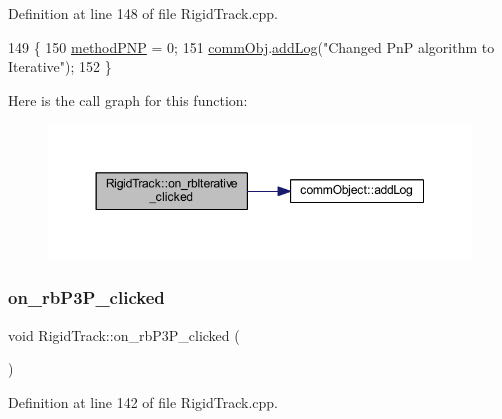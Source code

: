 Definition at line 148 of file Rigid\+Track.\+cpp.


\begin{DoxyCode}
149 \{
150     \hyperlink{main_8cpp_ab5e634b66221f494504aea1557af5df9}{methodPNP} = 0;
151     \hyperlink{main_8cpp_af29e7fc07ae0979d5fb61b473241d33d}{commObj}.\hyperlink{classcomm_object_aec354c7099b3039083cc4224e071e022}{addLog}(\textcolor{stringliteral}{"Changed PnP algorithm to Iterative"});
152 \}
\end{DoxyCode}
Here is the call graph for this function\+:
\nopagebreak
\begin{figure}[H]
\begin{center}
\leavevmode
\includegraphics[width=350pt]{class_rigid_track_ae5bcdd3fb7203b4a7d1fa97c1460af31_cgraph}
\end{center}
\end{figure}
\mbox{\label{class_rigid_track_ac1f10ea5ec3f718c152e245a04776454}} 
\subsubsection{\texorpdfstring{on\+\_\+rb\+P3\+P\+\_\+clicked}{on\_rbP3P\_clicked}}
{\footnotesize\ttfamily void Rigid\+Track\+::on\+\_\+rb\+P3\+P\+\_\+clicked (\begin{DoxyParamCaption}{ }\end{DoxyParamCaption})\hspace{0.3cm}{\ttfamily [slot]}}



Definition at line 142 of file Rigid\+Track.\+cpp.


